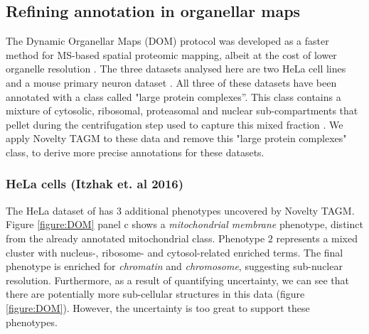 \documentclass[12pt,english]{article}
\begin{document}
\clearpage
\subsection{Refining annotation in organellar maps}
The Dynamic Organellar Maps (DOM) protocol was developed as a faster method for MS-based spatial proteomic mapping, albeit at the cost of lower organelle resolution \citep{Itzhak:2016,Gatto::2019}. The three datasets analysed here are two HeLa cell lines \citep{Itzhak:2016, Hirst:2018} and a mouse primary neuron dataset \citep{Itzhak::2017}. All three of these datasets have been annotated with a class called "large protein complexes''. This class contains a mixture of cytosolic, ribosomal, proteasomal and nuclear sub-compartments that pellet during the centrifugation step used to capture this mixed fraction \citep{Itzhak:2016}. We apply Novelty TAGM to these data and remove this "large protein complexes" class, to derive more precise annotations for these datasets. 
\subsubsection{HeLa cells (Itzhak et. al 2016)}
The HeLa dataset of \cite{Itzhak:2016}  has $3$ additional phenotypes uncovered by Novelty TAGM. Figure \ref{figure:DOM} panel c shows a \textit{mitochondrial membrane} phenotype, distinct from the already annotated mitochondrial class.
Phenotype $2$ represents a mixed cluster with nucleus-, ribosome- and cytosol-related enriched terms. The final phenotype is enriched for \textit{chromatin} and \textit{chromosome}, suggesting sub-nuclear resolution. Furthermore, as a result of quantifying uncertainty, we can see that there are potentially more sub-cellular structures in this data (figure \ref{figure:DOM}). However, the uncertainty is too great to support these phenotypes. 

\end{document}
